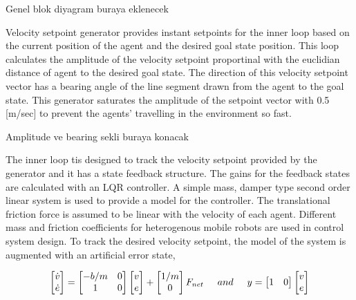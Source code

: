 \documentclass[twoside]{article}
\begin{document}
Genel blok diyagram buraya eklenecek

Velocity setpoint generator provides instant setpoints for the inner loop based on the current position of the agent and the desired goal state position.  This loop calculates the amplitude of the velocity setpoint proportinal with the euclidian distance of agent to the desired goal state. The direction of this velocity setpoint vector has a bearing angle of the line segment drawn from the agent to the goal state. This generator saturates the amplitude of the setpoint vector with 0.5 [m/sec] to prevent the agents' travelling in the environment so fast. 

Amplitude ve bearing sekli buraya konacak


The inner loop tis designed to track the velocity setpoint provided by the generator and it has a state feedback structure. The gains for the feedback states are calculated with an LQR controller. A simple mass, damper type second order linear system is used to provide a model for the controller. The translational friction force is assumed to be linear with the velocity of each agent. Different mass and friction coefficients for heterogenous mobile robots are used in control system design. To track the desired velocity setpoint, the model of the system is augmented with an artificial error state,

\begin{equation}
\begin{bmatrix}
\dot{v} \\ \dot{e}
\end{bmatrix}
=
\begin{bmatrix}
-b/m & 0 \\
1 & 0
\end{bmatrix}
\begin{bmatrix}
v \\ e
\end{bmatrix}
+ \begin{bmatrix}
1/m \\ 0
\end{bmatrix}
F_{net} \hspace{0.5cm} and
\hspace{0.5cm}
y = \begin{bmatrix}
1 & 0
\end{bmatrix}
\begin{bmatrix}
v \\ e
\end{bmatrix}
\end{equation}
\end{document}
